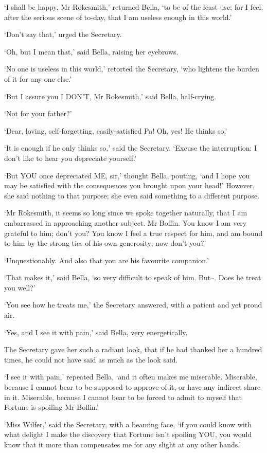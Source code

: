 ‘I shall be happy, Mr Rokesmith,’ returned Bella, ‘to be of the least
use; for I feel, after the serious scene of to-day, that I am useless
enough in this world.’

‘Don’t say that,’ urged the Secretary.

‘Oh, but I mean that,’ said Bella, raising her eyebrows.

‘No one is useless in this world,’ retorted the Secretary, ‘who lightens
the burden of it for any one else.’

‘But I assure you I DON’T, Mr Rokesmith,’ said Bella, half-crying.

‘Not for your father?’

‘Dear, loving, self-forgetting, easily-satisfied Pa! Oh, yes! He thinks
so.’

‘It is enough if he only thinks so,’ said the Secretary. ‘Excuse the
interruption: I don’t like to hear you depreciate yourself.’

‘But YOU once depreciated ME, sir,’ thought Bella, pouting, ‘and I hope
you may be satisfied with the consequences you brought upon your head!’
However, she said nothing to that purpose; she even said something to a
different purpose.

‘Mr Rokesmith, it seems so long since we spoke together naturally, that
I am embarrassed in approaching another subject. Mr Boffin. You know I
am very grateful to him; don’t you? You know I feel a true respect for
him, and am bound to him by the strong ties of his own generosity; now
don’t you?’

‘Unquestionably. And also that you are his favourite companion.’

‘That makes it,’ said Bella, ‘so very difficult to speak of him. But--.
Does he treat you well?’

‘You see how he treats me,’ the Secretary answered, with a patient and
yet proud air.

‘Yes, and I see it with pain,’ said Bella, very energetically.

The Secretary gave her such a radiant look, that if he had thanked her a
hundred times, he could not have said as much as the look said.

‘I see it with pain,’ repeated Bella, ‘and it often makes me miserable.
Miserable, because I cannot bear to be supposed to approve of it, or
have any indirect share in it. Miserable, because I cannot bear to be
forced to admit to myself that Fortune is spoiling Mr Boffin.’

‘Miss Wilfer,’ said the Secretary, with a beaming face, ‘if you could
know with what delight I make the discovery that Fortune isn’t spoiling
YOU, you would know that it more than compensates me for any slight at
any other hands.’

